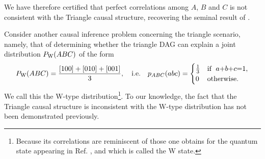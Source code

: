 We have therefore certified that perfect correlations among $A$, $B$ and $C$ is not consistent with the Triangle causal structure, recovering the seminal result of \citet{steudel2010ancestors}.

\par\smallskip\nobreak

Consider another causal inference problem concerning the triangle scenario, namely, that of determining whether the triangle DAG can explain a joint distribution $P_{\text{W}}\parenths{A B C}$ of the form
\begin{align}\label{eq:wdistribution1}
\pdf[\text{W}]{A B C}=\frac{[100]+[010]+[001]}{3},\quad\text{i.e.}\quad\p[ABC]{a b c}=\begin{cases}\tfrac{1}{3}&\text{if }\; a\cramp{+}b\cramp{+}c\eql 1, \\ 0&\text{otherwise}.\end{cases}
\end{align}
We call this the W-type distribution\footnote{Because its correlations are reminiscent of those one obtains for the quantum state appearing in Ref. \cite{3Qubits2Ways}, and which is called the W state.}. To our knowledge, the fact that the Triangle causal structure is inconsistent with the W-type distribution has not been demonstrated previously.

